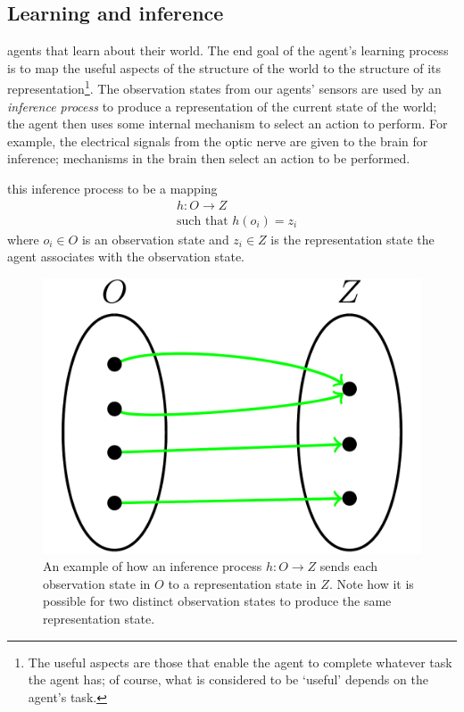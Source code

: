 \subsection{Learning and inference}

 agents that learn about their world.
The end goal of the agent’s learning process is to map the useful aspects of the structure of the world to the structure of its representation\footnote{
The useful aspects are those that enable the agent to complete whatever task the agent has; of course, what is considered to be `useful' depends on the agent's task.
}.
The observation states from our agents' sensors are used by an \emph{inference process} to produce a representation of the current state of the world; the agent then uses some internal mechanism to select an action to perform.
For example, the electrical signals from the optic nerve are given to the brain for inference; mechanisms in the brain then select an action to be performed.

 this inference process to be a mapping
\begin{equation}
\begin{aligned}
	& h: O \to Z \\
	& \text{such that } h(o_{i}) = z_{i}
\end{aligned}
\end{equation}
where $o_{i} \in O$ is an observation state and $z_{i} \in Z$ is the representation state the agent associates with the observation state.

\begin{figure}[H]
	\centering
	\includegraphics[width=0.5\linewidth]{2MathematicalFramework/Images/inference_process_O_to_Z.png}
	\caption{
		An example of how an inference process $h: O \to Z$ sends each observation state in $O$ to a representation state in $Z$.
		Note how it is possible for two distinct observation states to produce the same representation state.
	}
	\label{fig:inference_process_O_to_Z}
\end{figure}

